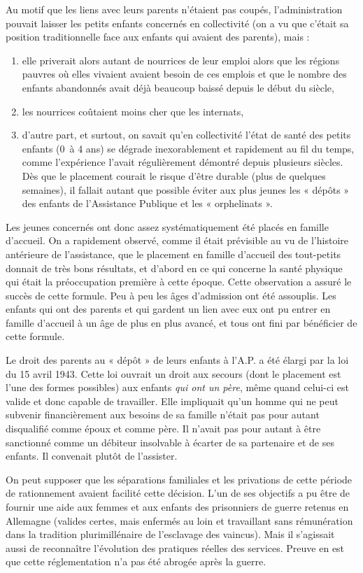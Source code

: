  Au motif que les liens avec leurs parents n'étaient pas coupés, l'administration pouvait laisser les petits enfants concernés en collectivité (on a vu que c'était sa position traditionnelle face aux enfants qui avaient des parents), mais :
\begin{enumerate}
\item elle priverait alors autant de nourrices de leur emploi alors que les régions pauvres où elles vivaient avaient besoin de ces emplois et que le nombre des enfants abandonnés avait déjà beaucoup baissé depuis le début du siècle,
\item les nourrices coûtaient moins cher que les internats,
\item d'autre part, et surtout, on savait qu'en collectivité l'état de santé des petits enfants (0~à 4 ans) se dégrade inexorablement et rapidement au fil du temps, comme l'expérience l'avait régulièrement démontré depuis plusieurs siècles. Dès que le placement courait le risque d'être durable (plus de quelques semaines), il fallait autant que possible éviter aux plus jeunes les « dépôts » des enfants de l'Assistance Publique et les « orphelinats ».
\end{enumerate}
 Les jeunes concernés ont donc assez systématiquement été placés en famille d'accueil. On a rapidement observé, comme il était prévisible au vu de l'histoire antérieure de l'assistance, que le placement en famille d'accueil des tout-petits donnait de très bons résultats, et d'abord en ce qui concerne la santé physique qui était la préoccupation première à cette époque. Cette observation a assuré le succès de cette formule. Peu à peu les âges d'admission ont été assouplis. Les enfants qui ont des parents et qui gardent un lien avec eux ont pu entrer en famille d'accueil à un âge de plus en plus avancé, et tous ont fini par bénéficier de cette formule. 

 Le droit des parents au « dépôt » de leurs enfants à l'A.P. a été élargi par la loi du 15 avril 1943. Cette loi ouvrait un droit aux secours (dont le placement est l'une des formes possibles) aux enfants \emph{qui ont un père}, même quand celui-ci est valide et donc capable de travailler. Elle impliquait qu'un homme qui ne peut subvenir financièrement aux besoins de sa famille n'était pas pour autant disqualifié comme époux et comme père. Il n'avait pas pour autant à être sanctionné comme un débiteur insolvable à écarter de sa partenaire et de ses enfants. Il convenait plutôt de l'assister.

 On peut supposer que les séparations familiales et les privations de cette période de rationnement avaient facilité cette décision. L'un de ses objectifs a pu être de fournir une aide aux femmes et aux enfants des prisonniers de guerre retenus en Allemagne (valides certes, mais enfermés au loin et travaillant sans rémunération dans la tradition plurimillénaire de l'esclavage des vaincus). Mais il s'agissait aussi de reconnaître l'évolution des pratiques réelles des services. Preuve en est que cette réglementation n'a pas été abrogée après la guerre. 

